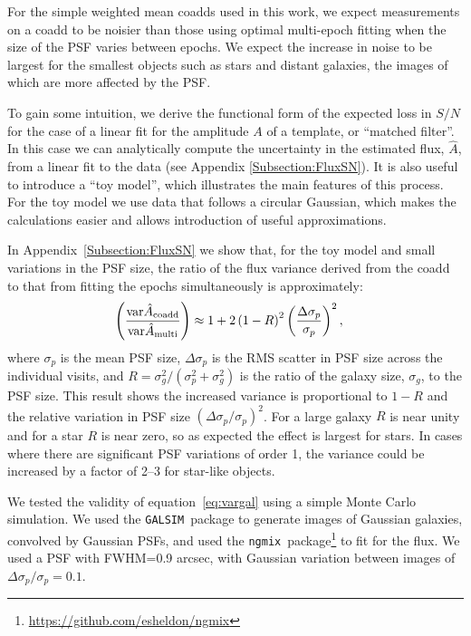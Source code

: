 \documentclass[fleqn,useAMS,usenatbib]{mnras}
\newcommand{\galsim}{\texttt{GALSIM}}
\newcommand{\ngmix}{\texttt{ngmix}}
\newcommand{\coadd}{{\rm coadd}}
\begin{document}
For the simple weighted mean coadds used in this work, we expect measurements
on a coadd to be noisier than those using optimal multi-epoch fitting when the
size of the PSF varies between epochs.  We expect the increase in noise to be
largest for the smallest objects such as stars and distant galaxies, the images
of which are more affected by the PSF.

To gain some intuition, we derive the functional form of the expected loss in
$S/N$ for the case of a linear fit for the amplitude $A$ of a template, or
``matched filter''.  In this case we can analytically compute the uncertainty
in the estimated flux, $\hat{A}$, from a linear fit to the data (see Appendix
\ref{Subsection:FluxSN}). It is also useful to introduce a ``toy model'', which
illustrates the main features of this process.  For the toy model we use data
that follows a circular Gaussian, which makes the calculations easier and
allows introduction of useful approximations.

In Appendix~\ref{Subsection:FluxSN} we show that, for the toy model and small
variations in the PSF size, the ratio of the flux variance derived from the
coadd to that from fitting the epochs simultaneously is approximately:
\begin{align} \label{eq:vargal}
\left( \frac{ {\rm var} \hat{A}_\coadd}{{\rm var} \hat{A}_{\rm multi} } 
\right) &
\approx 1 + 2 \left( 1 - R \right)^2 \left( \frac{\Delta 
\sigma_p}{\sigma_p} \right)^2,
\end{align}
where $\sigma_p$ is the mean PSF size, $\Delta \sigma_p$ is the RMS scatter in PSF
size across the individual visits, and $R=\sigma_g^2/(\sigma_p^2 + \sigma_g^2)$ is the ratio of the galaxy
size, $\sigma_g$, to the PSF size.  This result shows the increased variance is
proportional to $1-R$ and the relative variation in PSF size
$(\Delta \sigma_p/\sigma_p)^2$.  For a large galaxy $R$ is near unity and for a star
$R$ is near zero, so as expected the effect is largest for stars.  In cases where there
are significant PSF variations of order 1, the variance could be increased by a
factor of 2--3 for star-like objects.  

We tested the validity of equation~\eqref{eq:vargal} using a simple Monte Carlo
simulation.  We used the \galsim\ package \citep{GalSim} to generate images of Gaussian
galaxies, convolved by Gaussian PSFs, and used the \ngmix\ package\footnote{\url{https://github.com/esheldon/ngmix}} to fit for the flux. We used
a PSF with FWHM=0.9 arcsec, with Gaussian variation between images of $\Delta
\sigma_p/\sigma_p = 0.1$.
\end{document}
